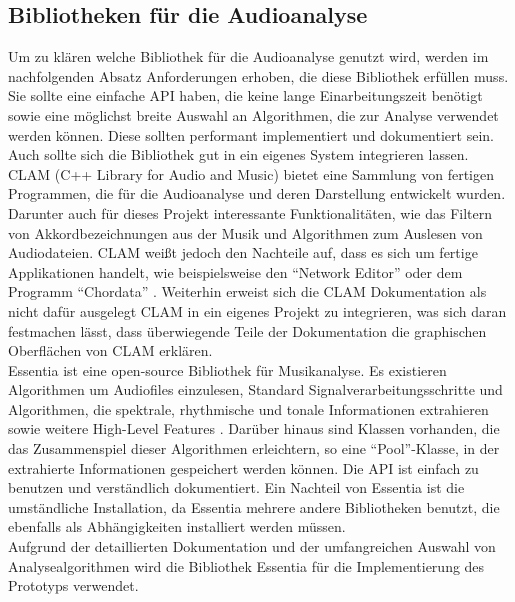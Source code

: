 \documentclass[11pt,a4paper]{article}
\begin{document}
\subsection{Bibliotheken für die Audioanalyse}
\label{sec:BibAudioanalyse}
Um zu klären welche Bibliothek für die Audioanalyse genutzt wird, werden im nachfolgenden Absatz Anforderungen erhoben, die diese Bibliothek erfüllen muss.\\
Sie sollte eine einfache API haben, die keine lange Einarbeitungszeit benötigt sowie eine möglichst breite Auswahl an Algorithmen, die zur Analyse verwendet werden können. Diese sollten performant implementiert und dokumentiert sein. Auch sollte sich die Bibliothek gut in ein eigenes System integrieren lassen.\\
CLAM (C++ Library for Audio and Music)\cite{clamProjekt} bietet eine Sammlung von fertigen Programmen, die für die Audioanalyse und deren Darstellung entwickelt wurden. Darunter auch für dieses Projekt interessante Funktionalitäten, wie das Filtern von Akkordbezeichnungen aus der Musik und Algorithmen zum Auslesen von Audiodateien. CLAM weißt jedoch den Nachteile auf, dass es sich um fertige Applikationen handelt, wie beispielsweise den ``Network Editor''\cite{clamProjektNetEditor} oder dem Programm ``Chordata'' \cite{clamProjektChorData}. Weiterhin erweist sich die CLAM Dokumentation als nicht dafür ausgelegt CLAM in ein eigenes Projekt zu integrieren, was sich daran festmachen lässt, dass überwiegende Teile der Dokumentation die graphischen Oberflächen von CLAM erklären.\\
Essentia ist eine open-source Bibliothek für Musikanalyse. Es existieren Algorithmen um Audiofiles einzulesen, Standard Signalverarbeitungsschritte und Algorithmen, die spektrale, rhythmische und tonale Informationen extrahieren sowie weitere High-Level Features \cite{Bogdanov:2013:EOL:2502081.2502229}. Darüber hinaus sind Klassen vorhanden, die das Zusammenspiel dieser Algorithmen erleichtern, so eine ``Pool''-Klasse, in der extrahierte Informationen gespeichert werden können. Die API ist einfach zu benutzen und verständlich dokumentiert. Ein Nachteil von Essentia ist die umständliche Installation, da Essentia mehrere andere Bibliotheken benutzt, die ebenfalls als Abhängigkeiten installiert werden müssen.\\
Aufgrund der detaillierten Dokumentation und der umfangreichen Auswahl von Analysealgorithmen wird die Bibliothek Essentia für die Implementierung des Prototyps verwendet.
\end{document}
